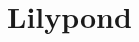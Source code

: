 \documentclass[12pt,brazil]{book}
\begin{document}









\chapter{Lilypond}
\label{sec:lilypond}
\end{document}

